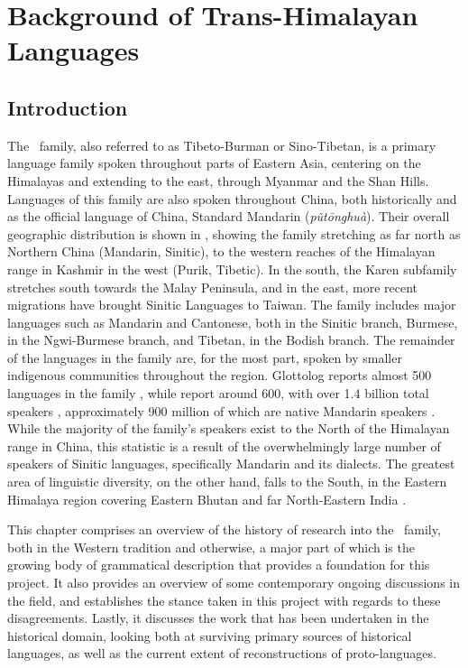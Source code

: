\chapter{Background of Trans-Himalayan Languages}

\section{Introduction}
The \lfam\ family, also referred to as Tibeto-Burman or Sino-Tibetan, is a primary language family spoken throughout parts of Eastern Asia, centering on the Himalayas and extending to the east, through Myanmar and the Shan Hills. Languages of this family are also spoken throughout China, both historically and as the official language of China, Standard Mandarin (\textit{pǔtōnghuà}). Their overall geographic distribution is shown in , showing the family stretching as far north as Northern China (Mandarin, Sinitic), to the western reaches of the Himalayan range in Kashmir in the west (Purik, Tibetic). In the south, the Karen subfamily stretches south towards the Malay Peninsula, and in the east, more recent migrations have brought Sinitic Languages to Taiwan. The family includes major languages such as Mandarin and Cantonese, both in the Sinitic branch, Burmese, in the Ngwi-Burmese branch, and Tibetan, in the Bodish branch. The remainder of the languages in the family are, for the most part, spoken by smaller indigenous communities throughout the region. Glottolog reports almost 500 languages in the family \cite{glottolog}, while  report around 600, with over 1.4 billion total speakers \cite{ZhangH2020Baye}, approximately 900 million of which are native Mandarin speakers \cite{Ethnologue}. While the majority of the family's speakers exist to the North of the Himalayan range in China, this statistic is a result of the overwhelmingly large number of speakers of Sinitic languages, specifically Mandarin and its dialects. The greatest area of linguistic diversity, on the other hand, falls to the South, in the Eastern Himalaya region covering Eastern Bhutan and far North-Eastern India \cite{BlenchPost2014}.

This chapter comprises an overview of the history of research into the \lfam\ family, both in the Western tradition and otherwise, a major part of which is the growing body of grammatical description that provides a foundation for this project. It also provides an overview of some contemporary ongoing discussions in the field, and establishes the stance taken in this project with regards to these disagreements. Lastly, it discusses the work that has been undertaken in the historical domain, looking both at surviving primary sources of historical languages, as well as the current extent of reconstructions of proto-languages.

